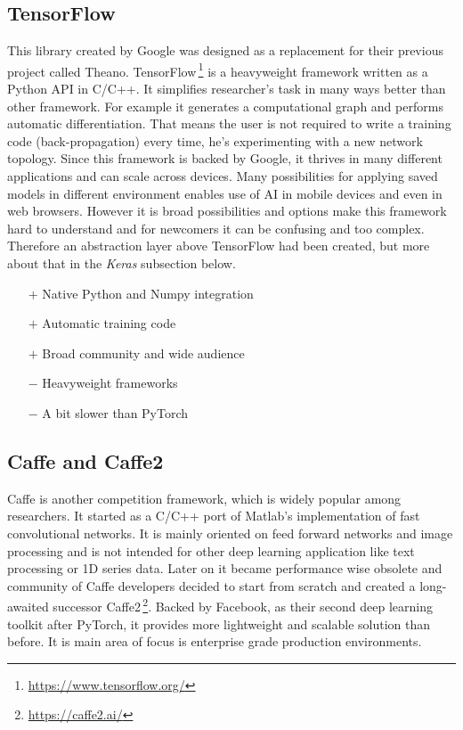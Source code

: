 \subsection{TensorFlow}

This library created by Google was designed as a replacement for their previous project called Theano. TensorFlow\,\footnote{\url{https://www.tensorflow.org/}} is a heavyweight framework written as a Python API in C/C++. It simplifies researcher's task in many ways better than other framework. For example it generates a computational graph and performs automatic differentiation. That means the user is not required to write a training code (back-propagation) every time, he's experimenting with a new network topology. Since this framework is backed by Google, it thrives in many different applications and can scale across devices. Many possibilities for applying saved models in different environment enables use of AI in mobile devices and even in web browsers. However it is broad possibilities and options make this framework hard to understand and for newcomers it can be confusing and too complex. Therefore an abstraction layer above TensorFlow had been created, but more about that in the \textit{Keras} subsection below.

\begin{itemize}
    \item[$\boldsymbol{+}$] Native Python and Numpy integration
    \item[$\boldsymbol{+}$] Automatic training code
    \item[$\boldsymbol{+}$] Broad community and wide audience
    \item[$\boldsymbol{-}$] Heavyweight frameworks
    \item[$\boldsymbol{-}$] A bit slower than PyTorch
\end{itemize}

\subsection{Caffe and Caffe2}

Caffe is another competition framework, which is widely popular among researchers. It started as a C/C++ port of Matlab's implementation of fast convolutional networks. It is mainly oriented on feed forward networks and image processing and is not intended for other deep learning application like text processing or 1D series data. Later on it became performance wise obsolete and community of Caffe developers decided to start from scratch and created a long-awaited successor Caffe2\,\footnote{\url{https://caffe2.ai/}}. Backed by Facebook, as their second deep learning toolkit after PyTorch, it provides more lightweight and scalable solution than before. It is main area of focus is enterprise grade production environments.

